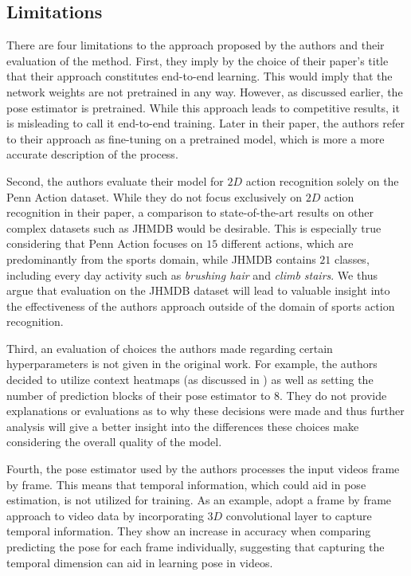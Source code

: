 \subsection{Limitations}
\label{sec:deephar_limitations}
There are four limitations to the approach proposed by the authors and their evaluation of the method.
First, they imply by the choice of their paper's title that their approach constitutes end-to-end learning.
This would imply that the network weights are not pretrained in any way.
However, as discussed earlier, the pose estimator is pretrained.
While this approach leads to competitive results, it is misleading to call it end-to-end training.
Later in their paper, the authors refer to their approach as fine-tuning on a pretrained model, which is more a more accurate description of the process. 

Second, the authors evaluate their model for $2D$ action recognition solely on the Penn Action dataset.
While they do not focus exclusively on $2D$ action recognition in their paper, a comparison to state-of-the-art results on other complex datasets such as JHMDB would be desirable.
This is especially true considering that Penn Action focuses on $15$ different actions, which are predominantly from the sports domain, while JHMDB contains $21$ classes, including every day activity such as \textit{brushing hair} and \textit{climb stairs}.
We thus argue that evaluation on the JHMDB dataset will lead to valuable insight into the effectiveness of the authors approach outside of the domain of sports action recognition. 

Third, an evaluation of choices the authors made regarding certain hyperparameters is not given in the original work.
For example, the authors decided to utilize context heatmaps (as discussed in ) as well as setting the number of prediction blocks of their pose estimator to $8$.
They do not provide explanations or evaluations as to why these decisions were made and thus further analysis will give a better insight into the differences these choices make considering the overall quality of the model.

Fourth, the pose estimator used by the authors processes the input videos frame by frame.
This means that temporal information, which could aid in pose estimation, is not utilized for training.
As an example, \cite{girdhar_detect-and-track:_2018} adopt a frame by frame approach to video data by incorporating $3D$ convolutional layer to capture temporal information.
They show an increase in accuracy when comparing predicting the pose for each frame individually, suggesting that capturing the temporal dimension can aid in learning pose in videos.

